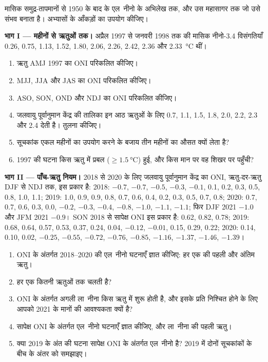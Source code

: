\begin{problem}[{सप्ताहांत समस्या --- एल नीनो गिनना}]\label{pb:b2:climate-variability:1}
मासिक समुद्र-तापमानों से 1950 के बाद के एल~नीनो के अभिलेख तक, और उस महासागर तक जो उसे
संभव बनाता है। अभ्यासों के आँकड़ों का उपयोग कीजिए।

\medskip\noindent\textbf{भाग I --- महीनों से ऋतुओं तक।}
अप्रैल 1997 से जनवरी 1998 तक की मासिक नीनो-3.4 विसंगतियाँ 0.26, 0.75, 1.13, 1.52, 1.80,
2.06, 2.26, 2.42, 2.36 और \qty{2.33}{\celsius} थीं।
\begin{enumerate}
  \item ऋतु AMJ 1997 का ONI परिकलित कीजिए।
  \item MJJ, JJA और JAS का ONI परिकलित कीजिए।
  \item ASO, SON, OND और NDJ का ONI परिकलित कीजिए।
  \item जलवायु पूर्वानुमान केंद्र की तालिका इन आठ ऋतुओं के लिए 0.7, 1.1, 1.5, 1.8, 2.0, 2.2, 2.3 और
        2.4 देती है। तुलना कीजिए।
  \item सूचकांक एकल महीनों का उपयोग करने के बजाय तीन महीनों का औसत क्यों लेता है?
  \item 1997 की घटना किस ऋतु में प्रबल ($\geq \qty{1.5}{\celsius}$) हुई, और किस
        मान पर वह शिखर पर पहुँची?
\end{enumerate}

\medskip\noindent\textbf{भाग II --- पाँच-ऋतु नियम।}
2018 से 2020 के लिए जलवायु पूर्वानुमान केंद्र का ONI, ऋतु-दर-ऋतु DJF से
NDJ तक, इस प्रकार है: 2018: $-0.7$, $-0.7$, $-0.5$, $-0.3$, $-0.1$, 0.1, 0.2, 0.3, 0.5, 0.8, 1.0, 1.1; 2019: 1.0,
0.9, 0.9, 0.8, 0.7, 0.6, 0.4, 0.2, 0.3, 0.5, 0.7, 0.8; 2020: 0.7, 0.7, 0.6, 0.3, 0.0, $-0.2$,
$-0.3$, $-0.4$, $-0.8$, $-1.0$, $-1.1$, $-1.1$; फिर DJF 2021 $-1.0$ और JFM 2021 $-0.9$। SON 2018 से
सापेक्ष ONI इस प्रकार है: 0.62, 0.82, 0.78; 2019: 0.68, 0.64, 0.57, 0.53, 0.37, 0.24,
0.04, $-0.12$, $-0.01$, 0.15, 0.29, 0.22; 2020: 0.14, 0.10, 0.02, $-0.25$, $-0.55$, $-0.72$,
$-0.76$, $-0.85$, $-1.16$, $-1.37$, $-1.46$, $-1.39$।
\begin{enumerate}[resume]
  \item ONI के अंतर्गत 2018--2020 की एल~नीनो घटनाएँ ज्ञात कीजिए: हर एक की पहली और अंतिम ऋतु।
  \item हर एक कितनी ऋतुओं तक चलती है?
  \item ONI के अंतर्गत अगली ला~नीना किस ऋतु में शुरू होती है, और इसके प्रति निश्चित होने के लिए आपको
        2021 के मानों की आवश्यकता क्यों है?
  \item सापेक्ष ONI के अंतर्गत एल~नीनो घटनाएँ ज्ञात कीजिए, और ला~नीना की पहली ऋतु।
  \item क्या 2019 के अंत की घटना सापेक्ष ONI के अंतर्गत एल~नीनो है? 2019 में दोनों सूचकांकों के बीच
        के अंतर को समझाइए।
\end{enumerate}


\end{problem}
